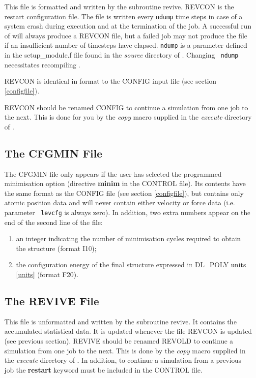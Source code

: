 This file is formatted and written by the subroutine {\sc revive}.
REVCON is the restart configuration file.  The file is written every
{\tt ndump} time steps in case of a system crash during execution and
at the termination of the job. A successful run of \D{} will always
produce a REVCON file, but a failed job may not produce the file if an
insufficient number of timesteps have elapsed. {\tt ndump} is a
parameter defined in the {\sc setup\_module.f} file found in the {\em
source} directory of \D{}.  Changing {\tt
ndump} necessitates recompiling \D{}.  

REVCON is identical in format to the CONFIG input file (see section
\ref{configfile}).

REVCON should be renamed CONFIG to continue a simulation from one job
to the next.  This is done for you by the {\sl copy} macro supplied in
the {\em execute} directory of \D{}.

\subsection{The CFGMIN File}
\label{cfgminfile}

The CFGMIN file only appears if the user has selected the programmed
minimisation option (directive {\bf minim} in the CONTROL file). Its
contents have the same format as the CONFIG file (see section
\ref{configfile}), but contains only atomic position data and will
never contain either velocity or force data (i.e. parameter {\tt
levcfg} is always zero).  In addition, two extra numbers appear on the
end of the second line of the file:
\begin{enumerate}
\item an integer indicating the number of minimisation cycles required
to obtain the structure (format I10);
\item the configuration energy of the final structure expressed in 
DL\_POLY units \ref{units} (format F20).
\end{enumerate}

\subsection{The REVIVE File}
\label{revivefile}

This file is unformatted and written by the subroutine {\sc revive}.
It contains the accumulated statistical data. It is updated whenever
the file REVCON is updated (see previous section). REVIVE should be
renamed REVOLD to continue a simulation from one job to
the next.  This is done by the {\sl copy} macro supplied in the
{\em execute} directory of \D{}. In addition, to continue a 
simulation from a previous job the {\bf restart} keyword must be
included in the CONTROL file.

